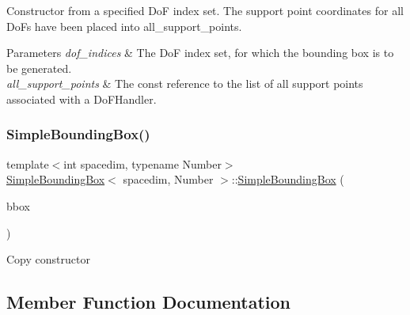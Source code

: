 Constructor from a specified DoF index set. The support point coordinates for all Do\+Fs have been placed into {\ttfamily all\+\_\+support\+\_\+points}. 
\begin{DoxyParams}{Parameters}
{\em dof\+\_\+indices} & The DoF index set, for which the bounding box is to be generated. \\
\hline
{\em all\+\_\+support\+\_\+points} & The const reference to the list of all support points associated with a Do\+F\+Handler. \\
\hline
\end{DoxyParams}
\mbox{\label{classSimpleBoundingBox_adb50933d0b5a524cfa98f79fd231d557}} 
\subsubsection{\texorpdfstring{Simple\+Bounding\+Box()}{SimpleBoundingBox()}\hspace{0.1cm}{\footnotesize\ttfamily [7/7]}}
{\footnotesize\ttfamily template$<$int spacedim, typename Number$>$ \\
\hyperlink{classSimpleBoundingBox}{Simple\+Bounding\+Box}$<$ spacedim, Number $>$\+::\hyperlink{classSimpleBoundingBox}{Simple\+Bounding\+Box} (\begin{DoxyParamCaption}\item[{const \hyperlink{classSimpleBoundingBox}{Simple\+Bounding\+Box}$<$ spacedim, Number $>$ \&}]{bbox }\end{DoxyParamCaption})}

Copy constructor 

\subsection{Member Function Documentation}
\mbox{\label{classSimpleBoundingBox_a140e9c7c01b868cfe6a5288f69522bf4}} 
